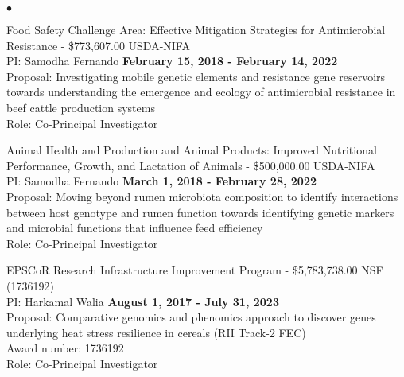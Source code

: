 \documentclass[margin,line,10pt]{res}
\newenvironment{list2}{
  \begin{list}{$\bullet$}{%
      \setlength{\itemsep}{0in}
      \setlength{\parsep}{0in} \setlength{\parskip}{0in}
      \setlength{\topsep}{0in} \setlength{\partopsep}{0in} 
      \setlength{\leftmargin}{0.2in}}}{\end{list}}
\begin{document}
\begin{resume}
\begin{list2}
\item Food Safety Challenge Area: Effective Mitigation Strategies for Antimicrobial Resistance  - \$773,607.00  \hfill USDA-NIFA\\
PI: Samodha Fernando   \hfill \textbf{February 15, 2018 - February 14, 2022}\\
Proposal: Investigating mobile genetic elements and resistance gene reservoirs towards understanding the emergence and ecology of antimicrobial resistance in beef cattle production systems  \\
Role: Co-Principal Investigator \\

\vspace{0.5cm}

\item Animal Health and Production and Animal Products: Improved Nutritional Performance, Growth, and Lactation of Animals  - \$500,000.00  \hfill USDA-NIFA\\
PI: Samodha Fernando   \hfill \textbf{March 1, 2018 - February 28, 2022}\\
Proposal: Moving beyond rumen microbiota composition to identify interactions between host genotype and rumen function towards identifying genetic markers and microbial functions that influence feed efficiency  \\
Role: Co-Principal Investigator \\

\vspace{0.5cm}





\vspace{0.5cm}
  
\item EPSCoR Research Infrastructure Improvement Program - \$5,783,738.00   \hfill NSF (1736192) \\
PI: Harkamal Walia   \hfill \textbf{August 1, 2017 - July 31, 2023}\\
Proposal:  Comparative genomics and phenomics approach to discover genes underlying heat stress resilience in cereals  (RII Track-2 FEC)  \\
Award number: 1736192 \\
Role: Co-Principal Investigator \\


\end{list2}
\end{resume}
\end{document}
